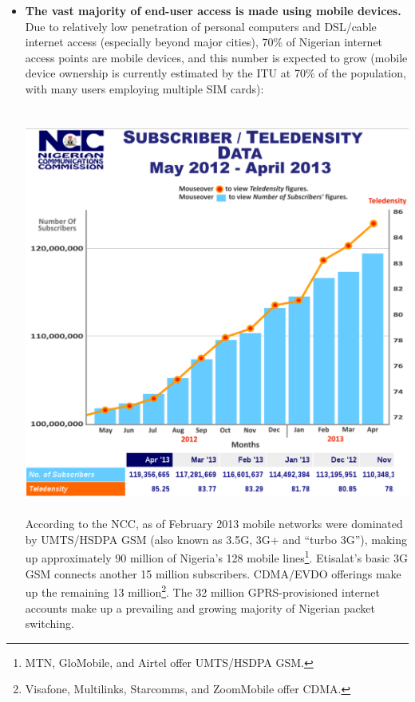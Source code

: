 \documentclass[]{sigplanconf}
\begin{document}
\begin{itemize}
The most latent hops here are, by far, the transatlantic jump from New Jersey
to London (Manasquan to Bude) over TAT-14's 1.87Tbps and the ride south over
the MTN Main One 1.28Tbps cable. Hops within Lagos are traversed with haste.
Several Nigerian servers selected from ProxyNova's database\cite{proxynova}
indicated \textasciitilde 10ms hops to Abuja (the capital) and major population
centers Kano and Kaduna.

\item \textbf{The vast majority of end-user access is made using mobile
devices.} Due to relatively low penetration of personal computers and DSL/cable
internet access (especially beyond major cities), 70\% of Nigerian internet
access points are mobile devices, and this number is expected to grow (mobile
device ownership is currently estimated by the ITU at 70\% of the population,
with many users employing multiple SIM cards):\\
\\
\\
\includegraphics[width=\linewidth]{ncc.pdf}
\\
\\
According to the NCC, as of February 2013 mobile networks were dominated by
UMTS/HSDPA GSM (also known as 3.5G, 3G+ and ``turbo 3G''), making up
approximately 90 million of Nigeria's 128 mobile lines\footnote{MTN, GloMobile,
and Airtel offer UMTS/HSDPA GSM.}. Etisalat's basic 3G GSM connects another 15
million subscribers. CDMA/EVDO offerings make up the remaining 13
million\footnote{Visafone, Multilinks, Starcomms, and ZoomMobile offer
CDMA.}. The 32 million GPRS-provisioned internet accounts make up a
prevailing and growing majority of Nigerian packet switching.
\end{itemize}
\end{document}
